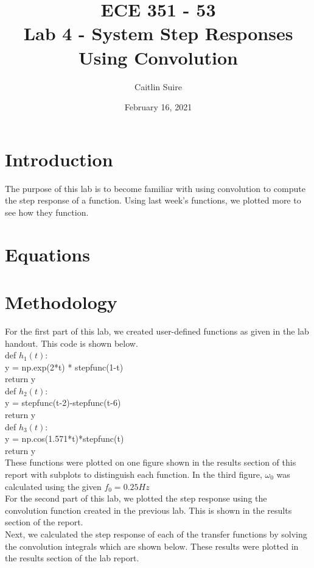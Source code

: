 \documentclass[12pt]{report}
\title{\myfont \textbf{ ECE 351 - 53 \\ \bigskip Lab 4 - System Step Responses Using Convolution}}
\author{Caitlin Suire}
\date{February 16, 2021}
\begin{document}
\maketitle

\thispagestyle{empty}

\newpage

\tableofcontents
\pagebreak


\section{Introduction}
The purpose of this lab is to become familiar with using convolution to compute the step response of a function. Using last week's functions, we plotted more to see how they function. 

\section{Equations}


\section{Methodology}
For the first part of this lab, we created user-defined functions as given in the lab handout. This code is shown below.\\

def $h_1(t)$:\\
\indent \indent    y = np.exp(2*t) * stepfunc(1-t)\\
\indent  \indent  return y\\

def $h_2(t):$\\
\indent   \indent y = stepfunc(t-2)-stepfunc(t-6)\\
\indent   \indent return y\\

def $h_3(t):$\\
\indent   \indent y = np.cos(1.571*t)*stepfunc(t)\\
\indent    \indent return y\\

\noindent These functions were plotted on one figure shown in the results section of this report with subplots to distinguish each function. In the third figure, $ \omega_0 $ was calculated using the given $f_0 = 0.25 Hz$  \\

\noindent For the second part of this lab, we plotted the step response using the convolution function created in the previous lab. This is shown in the results section of the report. \\
\noindent Next, we calculated the step response of each of the transfer functions by solving the convolution integrals which are shown below. These results were plotted in the results section of the lab report.\\
\end{document}

